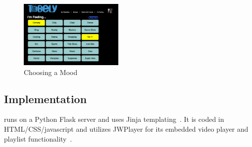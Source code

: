 \begin{figure} 
\centering
 \includegraphics[width=0.45\textwidth]{pics/mood.png}
\caption{Choosing a Mood}
\end{figure}

\subsection{Implementation}
{\sys} runs on a Python Flask server and uses Jinja
templating~\cite{flask,jinja}.  It is coded in HTML/CSS/javascript and utilizes JWPlayer
for its embedded video player and playlist functionality~\cite{jwplayer}.
